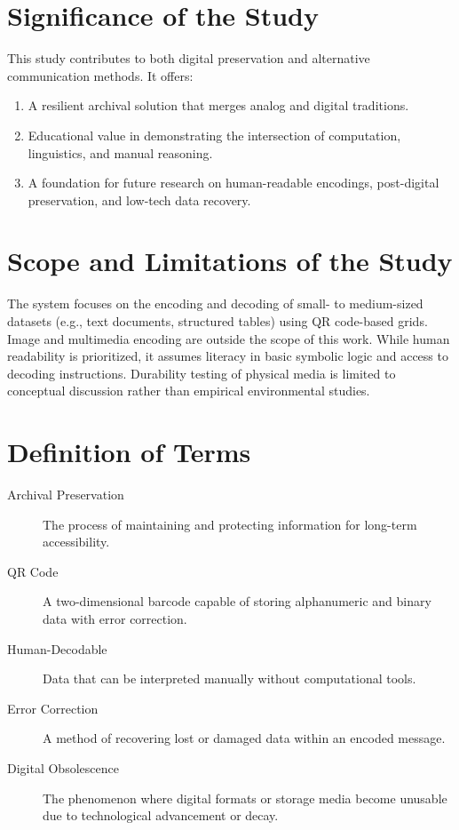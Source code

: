 \documentclass[../../1_thesis]{subfiles}
\begin{document}
\section{Significance of the Study}

This study contributes to both digital preservation and alternative communication methods. It offers:

\begin{enumerate}
\item A resilient archival solution that merges analog and digital traditions.
\item Educational value in demonstrating the intersection of computation, linguistics, and manual reasoning.
\item A foundation for future research on human-readable encodings, post-digital preservation, and low-tech data recovery.
\end{enumerate}

\section{Scope and Limitations of the Study}
The system focuses on the encoding and decoding of small- to medium-sized datasets (e.g., text documents, structured tables) using QR code-based grids. Image and multimedia encoding are outside the scope of this work. While human readability is prioritized, it assumes literacy in basic symbolic logic and access to decoding instructions. Durability testing of physical media is limited to conceptual discussion rather than empirical environmental studies.

\section{Definition of Terms}
\begin{description}
\item[Archival Preservation] The process of maintaining and protecting information for long-term accessibility.
\item[QR Code] A two-dimensional barcode capable of storing alphanumeric and binary data with error correction.
\item[Human-Decodable] Data that can be interpreted manually without computational tools.
\item[Error Correction] A method of recovering lost or damaged data within an encoded message.
\item[Digital Obsolescence] The phenomenon where digital formats or storage media become unusable due to technological advancement or decay.
\end{description}
\end{document}
